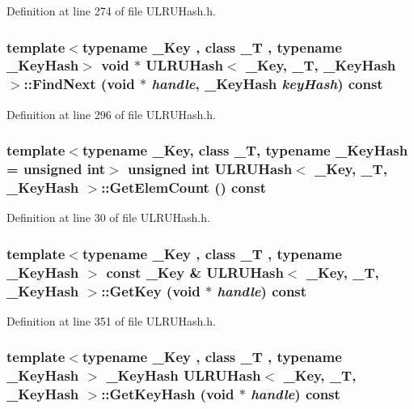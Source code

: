 Definition at line 274 of file ULRUHash.h.\hypertarget{class_u_l_r_u_hash_f12a2f713bc64feffdaa15cc64137a9e}{
\subsubsection[{FindNext}]{\setlength{\rightskip}{0pt plus 5cm}template$<$typename \_\-Key , class \_\-T , typename \_\-KeyHash$>$ void $\ast$ {\bf ULRUHash}$<$ \_\-Key, \_\-T, \_\-KeyHash $>$::FindNext (void $\ast$ {\em handle}, \/  \_\-KeyHash {\em keyHash}) const}}
\label{class_u_l_r_u_hash_f12a2f713bc64feffdaa15cc64137a9e}




Definition at line 296 of file ULRUHash.h.\hypertarget{class_u_l_r_u_hash_a2e102da1f9a2579533a429b535e9ded}{
\subsubsection[{GetElemCount}]{\setlength{\rightskip}{0pt plus 5cm}template$<$typename \_\-Key, class \_\-T, typename \_\-KeyHash = unsigned int$>$ unsigned int {\bf ULRUHash}$<$ \_\-Key, \_\-T, \_\-KeyHash $>$::GetElemCount () const}}
\label{class_u_l_r_u_hash_a2e102da1f9a2579533a429b535e9ded}




Definition at line 30 of file ULRUHash.h.\hypertarget{class_u_l_r_u_hash_654d4c16c061e15cd05d4b3a06720517}{
\subsubsection[{GetKey}]{\setlength{\rightskip}{0pt plus 5cm}template$<$typename \_\-Key , class \_\-T , typename \_\-KeyHash $>$ const \_\-Key \& {\bf ULRUHash}$<$ \_\-Key, \_\-T, \_\-KeyHash $>$::GetKey (void $\ast$ {\em handle}) const}}
\label{class_u_l_r_u_hash_654d4c16c061e15cd05d4b3a06720517}




Definition at line 351 of file ULRUHash.h.\hypertarget{class_u_l_r_u_hash_bef81214ae7f386a7259178ee4308b99}{
\subsubsection[{GetKeyHash}]{\setlength{\rightskip}{0pt plus 5cm}template$<$typename \_\-Key , class \_\-T , typename \_\-KeyHash $>$ \_\-KeyHash {\bf ULRUHash}$<$ \_\-Key, \_\-T, \_\-KeyHash $>$::GetKeyHash (void $\ast$ {\em handle}) const}}
\label{class_u_l_r_u_hash_bef81214ae7f386a7259178ee4308b99}




